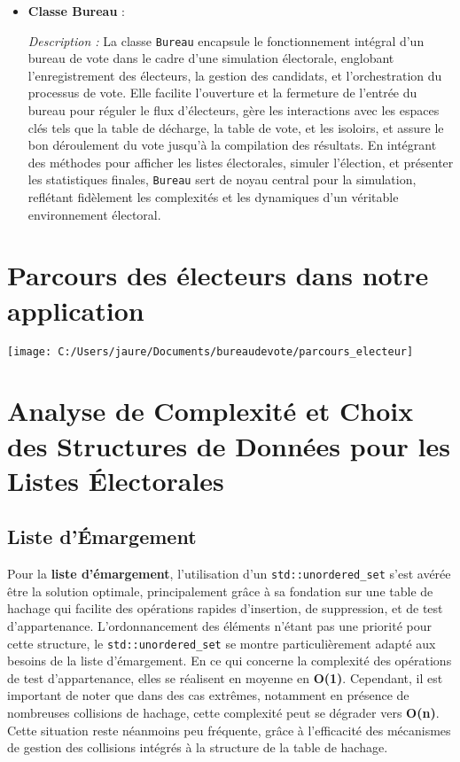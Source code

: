 \documentclass[12pt]{article} %
\begin{document}
\begin{itemize}[leftmargin=*,label={}]
	\item \textbf{Classe Bureau} :
	
	\textit{Description :} La classe \texttt{Bureau} encapsule le fonctionnement intégral d'un bureau de vote dans le cadre d'une simulation électorale, englobant l'enregistrement des électeurs, la gestion des candidats, et l'orchestration du processus de vote. Elle facilite l'ouverture et la fermeture de l'entrée du bureau pour réguler le flux d'électeurs, gère les interactions avec les espaces clés tels que la table de décharge, la table de vote, et les isoloirs, et assure le bon déroulement du vote jusqu'à la compilation des résultats. En intégrant des méthodes pour afficher les listes électorales, simuler l'élection, et présenter les statistiques finales, \texttt{Bureau} sert de noyau central pour la simulation, reflétant fidèlement les complexités et les dynamiques d'un véritable environnement électoral.
	
\end{itemize}	
\section*{\centering Parcours des électeurs dans notre application}

\begin{center}
	\texttt{[image: C:/Users/jaure/Documents/bureaudevote/parcours\_electeur]}
\end{center}

\newpage

\section*{Analyse de Complexité et Choix des Structures de Données pour les Listes Électorales}
\subsection*{Liste d'Émargement}

Pour la \textbf{liste d'émargement}, l'utilisation d'un \texttt{std::unordered\_set} s'est avérée être la solution optimale, principalement grâce à sa fondation sur une table de hachage qui facilite des opérations rapides d'insertion, de suppression, et de test d'appartenance. L'ordonnancement des éléments n'étant pas une priorité pour cette structure, le \texttt{std::unordered\_set} se montre particulièrement adapté aux besoins de la liste d'émargement. En ce qui concerne la complexité des opérations de test d'appartenance, elles se réalisent en moyenne en \textbf{O(1)}. Cependant, il est important de noter que dans des cas extrêmes, notamment en présence de nombreuses collisions de hachage, cette complexité peut se dégrader vers \textbf{O(n)}. Cette situation reste néanmoins peu fréquente, grâce à l'efficacité des mécanismes de gestion des collisions intégrés à la structure de la table de hachage.
\end{document}
